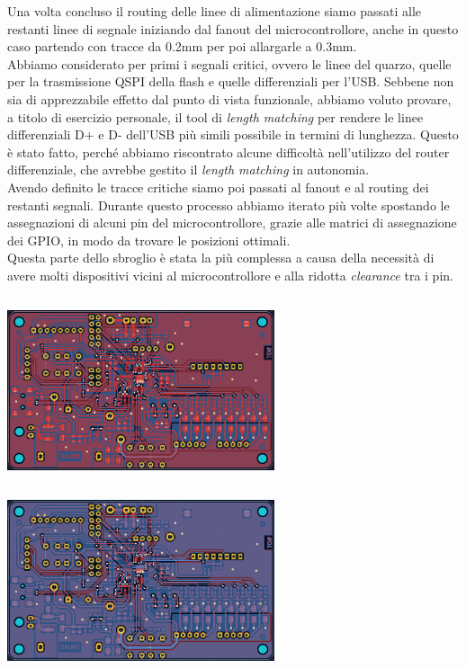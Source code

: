 \noindent Una volta concluso il routing delle linee di alimentazione siamo passati
alle restanti linee di segnale iniziando dal fanout del
microcontrollore, anche in questo caso partendo con tracce da 0.2mm per
poi allargarle a 0.3mm.\\
Abbiamo considerato per primi i segnali critici, ovvero le linee del
quarzo, quelle per la trasmissione QSPI della flash e quelle
differenziali per l'USB. Sebbene non sia di apprezzabile effetto dal
punto di vista funzionale, abbiamo voluto provare, a titolo di esercizio
personale, il tool di \emph{length matching} per rendere le linee
differenziali D+ e D- dell'USB più simili possibile in termini di
lunghezza. Questo è stato fatto, perché abbiamo riscontrato alcune
difficoltà nell'utilizzo del router differenziale, che avrebbe gestito
il \emph{length matching} in autonomia.\\
Avendo definito le tracce critiche siamo poi passati al fanout e al
routing dei restanti segnali. Durante questo processo abbiamo iterato
più volte spostando le assegnazioni di alcuni pin del microcontrollore,
grazie alle matrici di assegnazione dei GPIO, in modo da trovare le
posizioni ottimali.\\
Questa parte dello sbroglio è stata la più complessa a causa della
necessità di avere molti dispositivi vicini al microcontrollore e alla
ridotta \emph{clearance} tra i pin.

\includegraphics[width=3.09028in,height=2.15428in]{figures/image59.png}
\includegraphics[width=3.09028in,height=2.15428in]{figures/image22.png}
\begin{center}
\captionsetup{type=figure}
\end{center}

